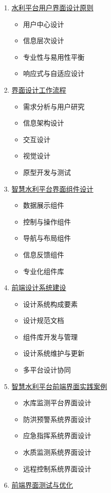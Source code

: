 \begin{enumerate}
\def\labelenumi{\arabic{enumi}.}
\tightlist
\item
  \href{./section04-04-01.md}{水利平台用户界面设计原则}

  \begin{itemize}
  \tightlist
  \item
    用户中心设计
  \item
    信息层次设计
  \item
    专业性与易用性平衡
  \item
    响应式与自适应设计
  \end{itemize}
\item
  \href{./section04-04-02.md}{界面设计工作流程}

  \begin{itemize}
  \tightlist
  \item
    需求分析与用户研究
  \item
    信息架构设计
  \item
    交互设计
  \item
    视觉设计
  \item
    原型开发与测试
  \end{itemize}
\item
  \href{./section04-04-03.md}{智慧水利平台界面组件设计}

  \begin{itemize}
  \tightlist
  \item
    数据展示组件
  \item
    控制与操作组件
  \item
    导航与布局组件
  \item
    信息反馈组件
  \item
    专业化组件库
  \end{itemize}
\item
  \href{./section04-04-04.md}{前端设计系统建设}

  \begin{itemize}
  \tightlist
  \item
    设计系统构成要素
  \item
    设计规范文档
  \item
    组件库开发与管理
  \item
    设计系统维护与更新
  \item
    多平台设计协同
  \end{itemize}
\item
  \href{./section04-04-05.md}{智慧水利平台前端界面实践案例}

  \begin{itemize}
  \tightlist
  \item
    水库监测平台界面设计
  \item
    防洪预警系统界面设计
  \item
    应急指挥系统界面设计
  \item
    水质监测系统界面设计
  \item
    远程控制系统界面设计
  \end{itemize}
\item
  \href{./section04-04-06.md}{前端界面测试与优化}


\end{enumerate}
